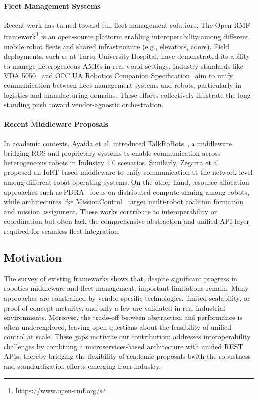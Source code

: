 \documentclass[conference]{IEEEtran}
\begin{document}
\paragraph{Fleet Management Systems} 
Recent work has turned toward full fleet management solutions. 
%
The Open-RMF framework\footnote{\url{https://www.open-rmf.org/}} is an open-source platform 
 enabling interoperability among different mobile robot fleets and shared infrastructure (e.g., elevators, doors). 
%
Field deployments, such as at Tartu University Hospital, have demonstrated its ability 
 to manage heterogeneous AMRs in real-world settings. 
%
Industry standards like VDA 5050~\cite{franke2023identification} 
 and OPC UA Robotics Companion Specification~\cite{DBLP:conf/etfa/ProfanterB0K19} 
 aim to unify communication between fleet management systems and robots, 
 particularly in logistics and manufacturing domains. 
%
These efforts collectively illustrate the long-standing push toward vendor-agnostic orchestration.

\paragraph{Recent Middleware Proposals} 
In academic contexts, Ayaida et al. introduced TalkRoBots~\cite{ayaida2022fi}, 
a middleware bridging ROS and proprietary systems to enable communication 
across heterogeneous robots in Industry 4.0 scenarios. 
%
Similarly, Zegarra et al.~\cite{cuadroszegarra2024jsan} proposed an IoRT-based middleware 
to unify communication at the network level among different robot operating systems. 
%
On the other hand, resource allocation approaches such as PDRA~\cite{DBLP:conf/iros/RossiVNSH20} 
focus on distributed compute sharing among robots, 
while architectures like MissionControl~\cite{DBLP:journals/jss/RodriguesCAMRP22} 
target multi-robot coalition formation and mission assignment. 
%
These works contribute to interoperability or coordination 
but often lack the comprehensive abstraction 
and unified API layer required for seamless fleet integration.

\subsection{Motivation}
The survey of existing frameworks shows that, 
 despite significant progress in robotics middleware and fleet management, important limitations remain. 
% 
Many approaches are constrained by vendor-specific technologies, limited scalability, 
 or proof-of-concept maturity, and only a few are validated in real industrial environments. 
% 
Moreover, the trade-off between abstraction and performance is often underexplored, 
 leaving open questions about the feasibility of unified control at scale. 
% 
These gaps motivate our contribution: 
 \approach{} addresses interoperability challenges by combining a microservices-based architecture 
  with unified REST APIs, thereby bridging the flexibility of academic proposals 
   bwith the robustness and standardization efforts emerging from industry.
\end{document}
